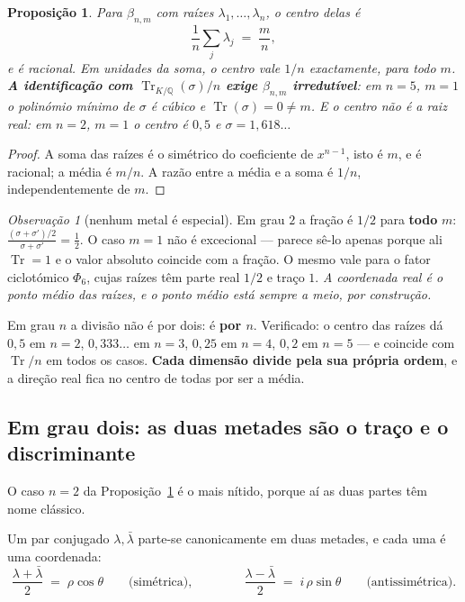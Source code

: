 \documentclass[11pt,a4paper]{article}
\theoremstyle{plain}
\newtheorem{proposicao}[teorema]{Proposição}
\theoremstyle{definition}
\theoremstyle{remark}
\newtheorem{obs}[teorema]{Observação}
\newcommand{\Q}{\mathbb{Q}}
\begin{document}
\begin{proposicao}\label{prop:centro}
Para $\beta_{n,m}$ com raízes $\lambda_1,\dots,\lambda_n$, o \emph{centro} delas é
\[
  \frac1n\sum_j \lambda_j \;=\; \frac{m}{n} ,
\]
e é racional. Em unidades da soma, o centro vale $1/n$ \emph{exactamente}, para todo $m$.
\textbf{A identificação com $\operatorname{Tr}_{K/\Q}(\sigma)/n$ exige $\beta_{n,m}$ irredutível}:
em $n=5$, $m=1$ o polinómio mínimo de $\sigma$ é cúbico e $\operatorname{Tr}(\sigma) = 0 \neq m$.
E o centro não é a raiz real: em $n=2$, $m=1$ o centro é $0{,}5$ e $\sigma = 1{,}618\ldots$
\end{proposicao}

\begin{proof}
A soma das raízes é o simétrico do coeficiente de $x^{n-1}$, isto é $m$, e é racional; a média é
$m/n$. A razão entre a média e a soma é $1/n$, independentemente de $m$.
\end{proof}

\begin{obs}[nenhum metal é especial]
Em grau $2$ a fração é $1/2$ para \textbf{todo} $m$: $\tfrac{(\sigma+\sigma')/2}{\sigma+\sigma'} =
\tfrac12$. O caso $m=1$ não é excecional --- parece sê-lo apenas porque ali $\operatorname{Tr}=1$ e
o valor absoluto coincide com a fração. O mesmo vale para o fator ciclotómico $\Phi_6$, cujas raízes
têm parte real $1/2$ e traço $1$. \emph{A coordenada real é o ponto médio das raízes, e o ponto
médio está sempre a meio, por construção.}
\end{obs}

\noindent Em grau $n$ a divisão não é por dois: é \textbf{por $n$}. Verificado: o centro das raízes
dá $0{,}5$ em $n=2$, $0{,}333\ldots$ em $n=3$, $0{,}25$ em $n=4$, $0{,}2$ em $n=5$ --- e coincide
com $\operatorname{Tr}/n$ em todos os casos. \textbf{Cada dimensão divide pela sua própria ordem}, e
a direção real fica no centro de todas por ser a média.

\subsection{Em grau dois: as duas metades são o traço e o discriminante}\label{sec:metades}

O caso $n=2$ da Proposição~\ref{prop:centro} é o mais nítido, porque aí as duas partes têm nome
clássico.

Um par conjugado $\lambda,\bar\lambda$ parte-se canonicamente em duas metades, e cada uma é uma
coordenada:
\[
  \frac{\lambda+\bar\lambda}{2} \;=\; \rho\cos\theta
  \qquad\text{(simétrica)},
  \qquad\qquad
  \frac{\lambda-\bar\lambda}{2} \;=\; i\,\rho\sin\theta
  \qquad\text{(antissimétrica)} .
\]
\end{document}
